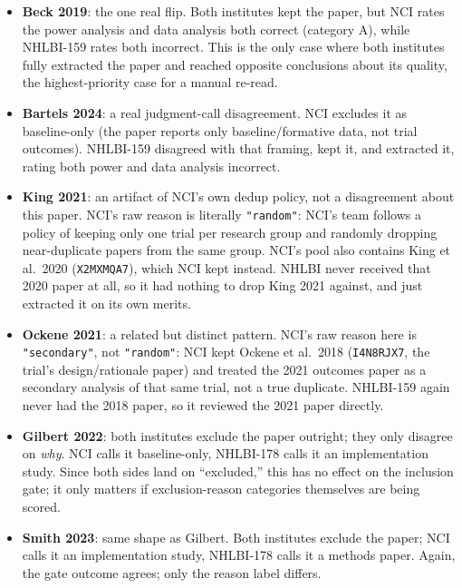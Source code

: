\documentclass[11pt]{article}
\begin{document}
\begin{itemize}
  \item \textbf{Beck 2019}: the one real flip. Both institutes kept the paper, but NCI rates
  the power analysis and data analysis both correct (category A), while NHLBI-159 rates both
  incorrect. This is the only case where both institutes fully extracted the paper and reached
  opposite conclusions about its quality, the highest-priority case for a manual re-read.

  \item \textbf{Bartels 2024}: a real judgment-call disagreement. NCI excludes it as
  baseline-only (the paper reports only baseline/formative data, not trial outcomes). NHLBI-159
  disagreed with that framing, kept it, and extracted it, rating both power and data analysis
  incorrect.

  \item \textbf{King 2021}: an artifact of NCI's own dedup policy, not a disagreement about
  this paper. NCI's raw reason is literally \texttt{"random"}: NCI's team follows a policy of
  keeping only one trial per research group and randomly dropping near-duplicate papers from the
  same group. NCI's pool also contains King et al.\ 2020 (\texttt{X2MXMQA7}), which NCI kept
  instead. NHLBI never received that 2020 paper at all, so it had nothing to drop King 2021
  against, and just extracted it on its own merits.

  \item \textbf{Ockene 2021}: a related but distinct pattern. NCI's raw reason here is
  \texttt{"secondary"}, not \texttt{"random"}: NCI kept Ockene et al.\ 2018
  (\texttt{I4N8RJX7}, the trial's design/rationale paper) and treated the 2021 outcomes paper as
  a secondary analysis of that same trial, not a true duplicate. NHLBI-159 again never had the
  2018 paper, so it reviewed the 2021 paper directly.

  \item \textbf{Gilbert 2022}: both institutes exclude the paper outright; they only disagree
  on \emph{why}. NCI calls it baseline-only, NHLBI-178 calls it an implementation study. Since
  both sides land on ``excluded,'' this has no effect on the inclusion gate; it only matters if
  exclusion-reason categories themselves are being scored.

  \item \textbf{Smith 2023}: same shape as Gilbert. Both institutes exclude the paper; NCI
  calls it an implementation study, NHLBI-178 calls it a methods paper. Again, the gate outcome
  agrees; only the reason label differs.
\end{itemize}
\end{document}
